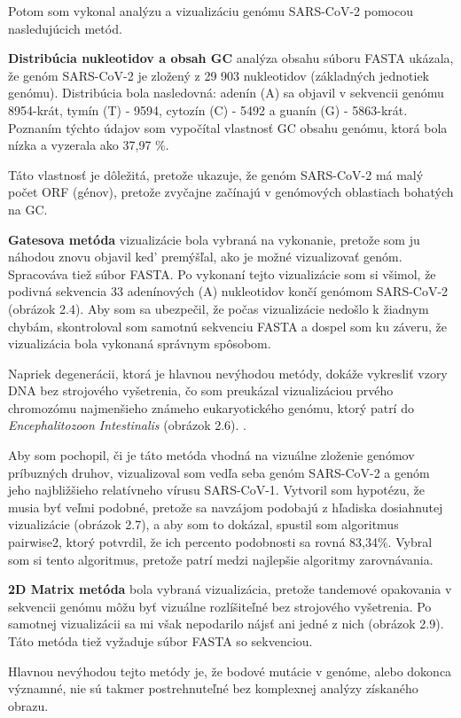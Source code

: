 Potom som vykonal analýzu a vizualizáciu genómu SARS-CoV-2 pomocou nasledujúcich metód.

\textbf{Distribúcia nukleotidov a obsah GC} analýza obsahu súboru FASTA ukázala, že genóm SARS-CoV-2 je zložený z 29 903 nukleotidov (základných jednotiek genómu).
Distribúcia bola nasledovná: adenín (A) sa objavil v sekvencii genómu 8954-krát, tymín (T) - 9594, cytozín (C) - 5492 a guanín (G) - 5863-krát.
Poznaním týchto údajov som vypočítal vlastnosť GC obsahu genómu, ktorá bola nízka a vyzerala ako 37,97 \%.

Táto vlastnosť je dôležitá, pretože ukazuje, že genóm SARS-CoV-2 má malý počet ORF (génov), pretože zvyčajne začínajú v genómových oblastiach bohatých na GC.

\textbf{Gatesova metóda} vizualizácie bola vybraná na vykonanie, pretože som ju náhodou znovu objavil ked' premýšľal, ako je možné vizualizovať genóm.
Spracováva tiež súbor FASTA.
Po vykonaní tejto vizualizácie som si všimol, že podivná sekvencia 33 adenínových (A) nukleotidov končí genómom SARS-CoV-2 (obrázok 2.4).
Aby som sa ubezpečil, že počas vizualizácie nedošlo k žiadnym chybám, skontroloval som samotnú sekvenciu FASTA a dospel som ku záveru, že vizualizácia bola vykonaná správnym spôsobom.
    
Napriek degenerácii, ktorá je hlavnou nevýhodou metódy, dokáže vykresliť vzory DNA bez strojového vyšetrenia, čo som preukázal vizualizáciou prvého chromozómu najmenšieho známeho eukaryotického genómu, ktorý patrí do \textit{Encephalitozoon Intestinalis} (obrázok 2.6). .

Aby som pochopil, či je táto metóda vhodná na vizuálne zloženie genómov príbuzných druhov, vizualizoval som vedľa seba genóm SARS-CoV-2 a genóm jeho najbližšieho relatívneho vírusu SARS-CoV-1.
Vytvoril som hypotézu, že musia byť veľmi podobné, pretože sa navzájom podobajú z hľadiska dosiahnutej vizualizácie (obrázok 2.7), a aby som to dokázal, spustil som algoritmus pairwise2, ktorý potvrdil, že ich percento podobnosti sa rovná 83,34\%.
Vybral som si tento algoritmus, pretože patrí medzi najlepšie algoritmy zarovnávania.

\textbf{2D Matrix metóda} bola vybraná vizualizácia, pretože tandemové opakovania v sekvencii genómu môžu byť vizuálne rozlíšiteľné bez strojového vyšetrenia.
Po samotnej vizualizácii sa mi však nepodarilo nájsť ani jedné z nich (obrázok 2.9).
Táto metóda tiež vyžaduje súbor FASTA so sekvenciou.

Hlavnou nevýhodou tejto metódy je, že bodové mutácie v genóme, alebo dokonca významné, nie sú takmer postrehnuteľné bez komplexnej analýzy získaného obrazu.

